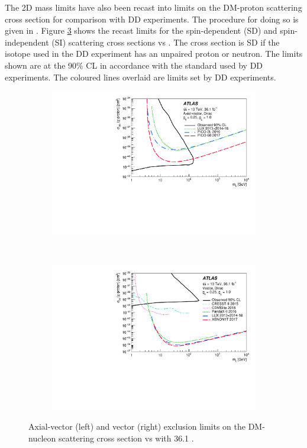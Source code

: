 The 2D mass limits have also been recast into limits on the DM-proton scattering cross section for comparison with DD experiments. The procedure for doing so is given in \cite{Boveia:2016mrp}. Figure \ref{fig:xsec} shows the recast \monoZ limits for the spin-dependent (SD) and spin-independent (SI) scattering cross sections vs \mmed. The cross section is SD if the isotope used in the DD experiment has an unpaired proton or neutron. The limits shown are at the 90\% CL in accordance with the standard used by DD experiments. The coloured lines overlaid are limits set by DD experiments.

\begin{figure}[htb]
    \centering
    \begin{subfigure}[b]{0.48\textwidth}
        \includegraphics[width=\textwidth]{Figures/xsec_dmA.pdf}
        \label{fig:xsec_dmA}
    \end{subfigure}
    ~ %
    \begin{subfigure}[b]{0.48\textwidth}
        \includegraphics[width=\textwidth]{Figures/xsec_dmV.pdf}
        \label{fig:xsec_dmV}
    \end{subfigure}
    \caption{Axial-vector (left) and vector (right) exclusion limits on the DM-nucleon scattering cross section vs \mmed with 36.1 \ifb.}
\label{fig:xsec}
\end{figure}

